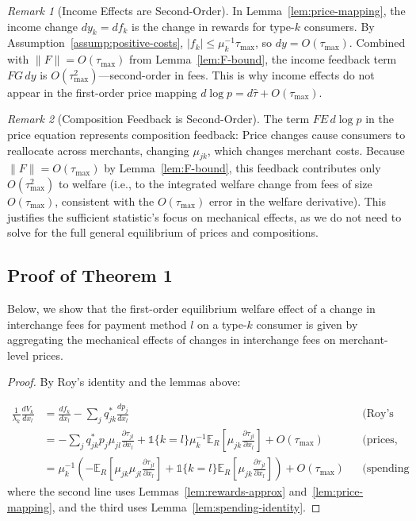 \documentclass[11pt,english]{article}
\theoremstyle{remark}
\newtheorem{remark}{Remark}
\begin{document}
\begin{remark}[Income Effects are Second-Order]\label{rem:income-effects}
In Lemma~\ref{lem:price-mapping}, the income change $dy_k = df_k$ is the change in rewards for type-$k$ consumers.
By Assumption~\ref{assump:positive-costs}, $|f_k| \leq \mu_k^{-1}\tau_{\max}$, so $dy = O(\tau_{\max})$.
Combined with $\|F\| = O(\tau_{\max})$ from Lemma~\ref{lem:F-bound}, the income feedback term $FG\,dy$ is $O(\tau_{\max}^2)$---second-order in fees.
This is why income effects do not appear in the first-order price mapping $d\log p = d\hat{\tau} + O(\tau_{\max})$.
\end{remark}

\begin{remark}[Composition Feedback is Second-Order]\label{rem:feedback}
The term $FE\,d\log p$ in the price equation represents composition feedback: Price changes cause consumers to reallocate across merchants, changing $\mu_{jk}$, which changes merchant costs.
Because $\|F\| = O(\tau_{\max})$ by Lemma~\ref{lem:F-bound}, this feedback contributes only $O(\tau_{\max}^2)$ to welfare (i.e., to the integrated welfare change from fees of size $O(\tau_{\max})$, consistent with the $O(\tau_{\max})$ error in the welfare derivative).
This justifies the sufficient statistic's focus on mechanical effects, as we do not need to solve for the full general equilibrium of prices and compositions.

\end{remark}

\subsection{Proof of Theorem 1}\label{subsec:proof-theorem1}

Below, we show that the first-order equilibrium welfare effect of a change in interchange fees for payment method $l$ on a type-$k$ consumer is given by aggregating the mechanical effects of changes in interchange fees on merchant-level prices.

\begin{proof}
By Roy's identity and the lemmas above:

\begin{align*}
\frac{1}{\lambda_k} \frac{dV_k}{dx_l}
&= \frac{df_k}{dx_l} - \sum_j q_{jk}^* \frac{dp_j}{dx_l} && \text{(Roy's identity)} \\
&= - \sum_j q_{jk}^* p_j \mu_{jl} \tfrac{\partial \tau_{jl}}{\partial x_l} + \mathbb{1}\{k=l\} \mu_k^{-1} \mathbb{E}_R\!\left[\mu_{jk} \tfrac{\partial \tau_{jl}}{\partial x_l}\right] + O(\tau_{\max}) && \text{(prices, rewards)} \\
&= \mu_k^{-1} \left( - \mathbb{E}_R\!\left[\mu_{jk} \mu_{jl} \tfrac{\partial \tau_{jl}}{\partial x_l}\right] + \mathbb{1}\{k=l\} \mathbb{E}_R\!\left[\mu_{jk} \tfrac{\partial \tau_{jl}}{\partial x_l}\right] \right) + O(\tau_{\max}) && \text{(spending identity)}
\end{align*}
where the second line uses Lemmas~\ref{lem:rewards-approx} and~\ref{lem:price-mapping}, and the third uses Lemma~\ref{lem:spending-identity}.

\end{proof}
\end{document}
